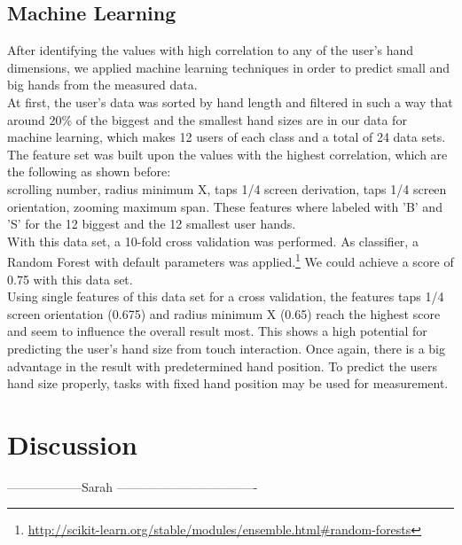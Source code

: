 \documentclass{sigchi}
\begin{document}
\subsection{Machine Learning}
After identifying the values with high correlation to any of the user's hand dimensions, we applied machine learning techniques in order to predict small and big hands from the measured data.\\
At first, the user's data was sorted by hand length and filtered in such a way that around 20\% of the biggest and the smallest hand sizes are in our data for machine learning, which makes 12 users of each class and a total of 24 data sets.\\
The feature set was built upon the values with the highest correlation, which are the following as shown before:\\ scrolling number, radius minimum X, taps 1/4 screen derivation, taps 1/4 screen orientation, zooming maximum span. These features where labeled with 'B' and 'S' for the 12 biggest and the 12 smallest user hands.\\
With this data set, a 10-fold cross validation was performed. As classifier, a Random Forest with default parameters was applied.\footnote{\url{http://scikit-learn.org/stable/modules/ensemble.html\#random-forests}} We could achieve a score of 0.75 with this data set.\\
Using single features of this data set for a cross validation, the features taps 1/4 screen orientation (0.675) and radius minimum X (0.65) reach the highest score and seem to influence the overall result most. This shows a high potential for predicting the user's hand size from touch interaction. Once again, there is a big advantage in the result with predetermined hand position. To predict the users hand size properly, tasks with fixed hand position may be used for measurement.

\section{Discussion}

------------------Sarah ----------------------------------
\end{document}
